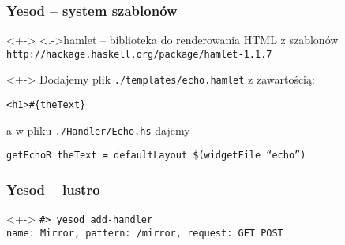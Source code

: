 \documentclass[landscape]{beamer}
\begin{document}
\begin{frame}
  \frametitle{Yesod -- system szablon\'ow}

  \begin{uncoverenv}<+->
    \alert<.->{hamlet} -- biblioteka do renderowania HTML z szablon\'ow \\
    \texttt{http://hackage.haskell.org/package/hamlet-1.1.7}
  \end{uncoverenv}

  \vspace{1em}

  \begin{uncoverenv}<+->
    Dodajemy plik \texttt{./templates/echo.hamlet} z zawarto\'sci\k{a}: \\

    \vspace{1em}

    \texttt{<h1>\#\{theText\}}

    \vspace{1em}

    a w pliku \texttt{./Handler/Echo.hs} dajemy \\
    
    \vspace{1em}

    \texttt{getEchoR theText = defaultLayout \$(widgetFile ``echo'')}
  \end{uncoverenv}
\end{frame}

\begin{frame}
  \frametitle{Yesod -- lustro}

  \begin{uncoverenv}<+->
    \texttt{\#> yesod add-handler} \\
    \texttt{name: Mirror, pattern: /mirror, request: GET POST}
  \end{uncoverenv}

  \vspace{1em}

\end{frame}
\end{document}
